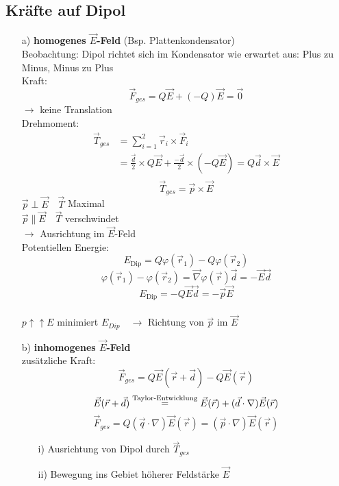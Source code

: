 \documentclass[titlepage,12pt,a4paper,ngerman]{report}
\newcommand{\tx}[1]{\textrm{#1}}
\begin{document}

\subsection{Kräfte auf Dipol}
\begin{itemize}
\item[a)] \textbf{homogenes $\vec{E}$-Feld} (Bsp. Plattenkondensator)\\
Beobachtung: Dipol richtet sich im Kondensator wie erwartet aus: Plus zu Minus, Minus zu Plus\\
Kraft: $$\vec{F}_{ges} = Q \vec{E} + (-Q) \vec{E} = \vec{0}$$ $\rightarrow$ keine Translation\\
Drehmoment: \begin{align*}
\vec{T}_{ges} & = \sum^2_{i=1} \vec{r}_i\times \vec{F}_i \\
& = \frac{\vec{d}}{2} \times Q\vec{E} + \frac{-\vec{d}}{2} \times (-Q\vec{E}) = Q \vec{d} \times \vec{E}\\
\end{align*}
$$\boxed{\vec{T}_{ges} = \vec{p} \times \vec{E}}$$
$\vec{p} \perp \vec{E} \quad \vec{T}$ Maximal\\
$ \vec{p} \parallel \vec{E} \quad \vec{T}$ verschwindet\\
$\rightarrow$ Ausrichtung im $\vec{E}$-Feld\\
Potentiellen Energie:\\
$$ E_{\tx{Dip}}= Q \varphi(\vec{r}_1) - Q \varphi(\vec{r}_2)$$
$$\varphi(\vec{r}_1) - \varphi(\vec{r}_2) = \vec{\nabla} \varphi(\vec{r}) \vec{d} = -\vec{E} \vec{d}$$
$$E_{\tx{Dip}} = - Q \vec{E}\vec{d} = - \vec{p} \vec{E}$$\\
$p \uparrow \uparrow E$ minimiert $E_{Dip} \quad \rightarrow$ Richtung von $\vec{p}$ im $\vec{E}$
\item[b)] \textbf{inhomogenes $\vec{E}$-Feld} \\
zusätzliche Kraft: $$\vec{F}_{ges} = Q \vec{E} (\vec{r}+\vec{d}) - Q \vec{E}(\vec{r})$$
$$\vec{E}(\vec{r}+\vec{d}) \buildrel \textrm{Taylor-Entwicklung} \over = \vec{E}(\vec{r}) + (\vec{d}\cdot \nabla ) \vec{E}(\vec{r})$$ 
$$\vec{F}_{ges} = Q ( \vec{q} \cdot \nabla ) \vec{E}(\vec{r}) = (\vec{p} \cdot \nabla ) \vec{E}(\vec{r})$$
\begin{itemize}
\item[i)] Ausrichtung von Dipol durch $\vec{T}_{ges}$
\item[ii)] Bewegung ins Gebiet höherer Feldstärke $\vec{E}$
\end{itemize}
\end{itemize}
\end{document}
